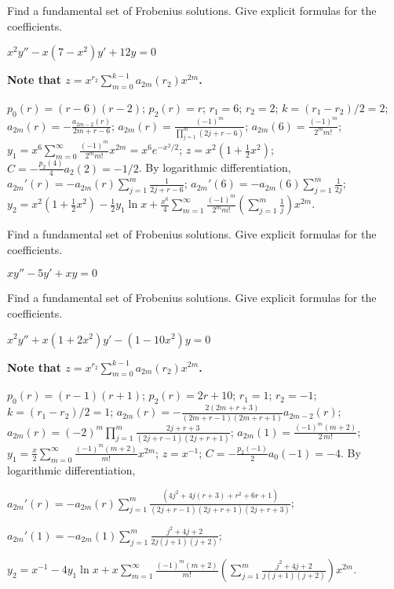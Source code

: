 \documentclass{ximera}
\begin{document}
\begin{problem}\label{exer:7.7.24}
Find
a fundamental set  of Frobenius solutions. Give explicit formulas for
the coefficients.

$x^2y''-x(7-x^2)y'+12y=0$
\begin{solution}
\textbf{Note that $z=x^{r_2}\sum_{m=0}^{k-1}a_{2m}(r_2)x^{2m}$.}

    $p_0(r)=(r-6)(r-2)$;
$p_2(r)=r$;
$r_1=6$; $r_2=2$; $k=(r_1-r_2)/2=2$;
$a_{2m}(r)=-\frac{a_{2m-2}(r)}{2m+r-6}
$;
 $a_{2m}(r)=\frac{(-1)^m}{\prod_{j=1}^m(2j+r-6)}$;
$a_{2m}(6)=\frac{(-1)^m}{2^mm!}$;
$y_1=x^6\sum_{m=0}^\infty\frac{(-1)^m}{2^mm!}x^{2m}=x^6e^{-x^2/2}$;
$z=x^2\left(1+\frac{1}{2}x^2\right)$;
$C=-\frac{p_2(4)}{4}a_2(2)=-1/2$.
By logarithmic differentiation,
$a_{2m}'(r)=- a_{2m}(r)\sum_{j=1}^m\frac{1}{2j+r-6}$;
$a_{2m}'(6)=-a_{2m}(6)\sum_{j=1}^m\frac{1}{2j}$;
$y_2=x^2\left(1+\frac{1}{2}x^2\right)-\frac{1}{2}y_1\ln
x+\frac{x^6}{4}\sum_{m=1}^\infty\frac{(-1)^m}{2^mm!}\left(\sum_{j=1}^m
\frac{1}{ j}\right)x^{2m}$.
\end{solution}
\end{problem}

\begin{problem}\label{exer:7.7.25}
Find
a fundamental set  of Frobenius solutions. Give explicit formulas for
the coefficients.

$xy''-5y'+xy=0$
\end{problem}

\begin{problem}\label{exer:7.7.26}
Find
a fundamental set  of Frobenius solutions. Give explicit formulas for
the coefficients.

$x^2y''+x(1+2x^2)y'-(1-10x^2)y=0$

\begin{solution}
    \textbf{Note that $z=x^{r_2}\sum_{m=0}^{k-1}a_{2m}(r_2)x^{2m}$.}

    $p_0(r)=(r-1)(r+1)$;
$p_2(r)=2r+10$;
$r_1=1$; $r_2=-1$; $k=(r_1-r_2)/2=1$;
$a_{2m}(r)=-\frac{2(2m+r+3)}{(2m+r-1)(2m+r+1)}a_{2m-2}(r)$;
 $a_{2m}(r)=(-2)^m\prod_{j=1}^m\frac{2j+r+3}{(2j+r-1)(2j+r+1)}$;
$a_{2m}(1)=\frac{(-1)^m(m+2)}{2\, m!}$;
$y_1=\frac{x}{2}\sum_{m=0}^\infty\frac{(-1)^m(m+2)}{ m!}x^{2m}$;
$z=x^{-1}$;
$C=-\frac{p_2(-1)}{ 2}a_0(-1)=-4$.
By logarithmic differentiation,

$a_{2m}'(r)=-a_{2m}(r)\sum_{j=1}^m
\frac{(4j^2+4j(r+3)+r^2+6r+1)}{(2j+r-1)(2j+r+1)(2j+r+3)}$;

$a_{2m}'(1)=-a_{2m}(1)\sum_{j=1}^m\frac{j^2+4j+2}{2j(j+1)(j+2)}$;

$y_2=x^{-1}-4y_1\ln x+x\sum_{m=1}^\infty\frac{(-1)^m(m+2)}{
m!}\left(\sum_{j=1}^m\frac{j^2+4j+2}{ j(j+1)(j+2)} \right)x^{2m}$.
\end{solution}
\end{problem}
\end{document}
